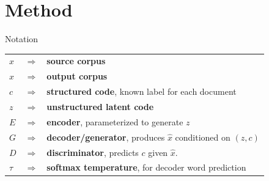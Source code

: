 \documentclass{beamer}
\begin{document}
\section{Method}
\begin{frame}{Notation}
	\large
	\begin{tabular}{ l c l }
		$x$       & $\Rightarrow$ & \textbf{source corpus}                                                 \\
		$\hat{x}$ & $\Rightarrow$ & \textbf{output corpus}                                                 \\
		$c$       & $\Rightarrow$ & \textbf{structured code}, known label for each document                \\
		$z$       & $\Rightarrow$ & \textbf{unstructured latent code}                                      \\
		$E$       & $\Rightarrow$ & \textbf{encoder}, parameterized to generate $z$                        \\
		$G$       & $\Rightarrow$ & \textbf{decoder/generator}, produces $\hat{x}$ conditioned on $(z, c)$ \\
		$D$       & $\Rightarrow$ & \textbf{discriminator}, predicts $c$ given $\hat{x}$.                  \\
		$\tau$    & $\Rightarrow$ & \textbf{softmax temperature}, for decoder word prediction              \\
	\end{tabular}
\end{frame}
\end{document}
